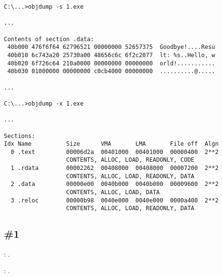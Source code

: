
\begin{lstlisting}
C:\...>objdump -s 1.exe 

...

Contents of section .data:
 40b000 476f6f64 62796521 00000000 52657375  Goodbye!....Resu
 40b010 6c743a20 25730a00 48656c6c 6f2c2077  lt: %s..Hello, w
 40b020 6f726c64 210a0000 00000000 00000000  orld!...........
 40b030 01000000 00000000 c0cb4000 00000000  ..........@.....

...

C:\...>objdump -x 1.exe 

...

Sections:
Idx Name          Size      VMA       LMA       File off  Algn
  0 .text         00006d2a  00401000  00401000  00000400  2**2
                  CONTENTS, ALLOC, LOAD, READONLY, CODE
  1 .rdata        00002262  00408000  00408000  00007200  2**2
                  CONTENTS, ALLOC, LOAD, READONLY, DATA
  2 .data         00000e00  0040b000  0040b000  00009600  2**2
                  CONTENTS, ALLOC, LOAD, DATA
  3 .reloc        00000b98  0040e000  0040e000  0000a400  2**2
                  CONTENTS, ALLOC, LOAD, READONLY, DATA
\end{lstlisting}

\subsection{}

\subsection{\Exercise \#1}
\label{exercise_solutions_switch_1}

\Exercise: .

: \printf {}.

\subsection{}


